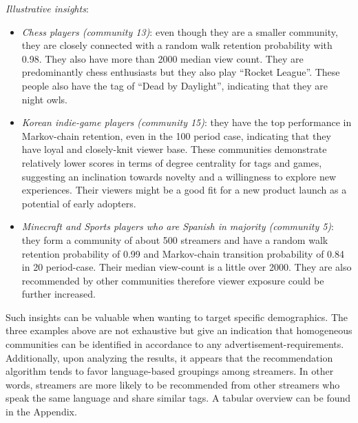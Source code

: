 \documentclass[11pt, oneside]{article}   	%
\begin{document}
\textit{Illustrative insights}:
\begin{itemize}
\item \textit{Chess players (community 13)}: even though they are a smaller community, they are closely connected with a random walk retention probability with 0.98. They also have more than 2000 median view count. They are predominantly chess enthusiasts but they also play “Rocket League”. These people also have the tag of “Dead by Daylight”, indicating that they are night owls.
\item \textit{Korean indie-game players (community 15)}: they have the top performance in Markov-chain retention, even in the 100 period case, indicating that they have loyal and closely-knit viewer base. These communities demonstrate relatively lower scores in terms of degree centrality for tags and games, suggesting an inclination towards novelty and a willingness to explore new experiences. Their viewers might be a good fit for a new product launch as a potential of early adopters.
\item \textit{Minecraft and Sports players who are Spanish in majority (community 5)}: they form a community of about 500 streamers and have a random walk retention probability of 0.99 and Markov-chain transition probability of 0.84 in 20 period-case. Their median view-count is a little over 2000. They are also recommended by other communities therefore viewer exposure could be further increased.
\end{itemize}

Such insights can be valuable when wanting to target specific demographics. The three examples above are not exhaustive but give an indication that homogeneous communities can be identified in accordance to any advertisement-requirements. Additionally, upon analyzing the results, it appears that the recommendation algorithm tends to favor language-based groupings among streamers. In other words, streamers are more likely to be recommended from other streamers who speak the same language and share similar tags. A tabular overview can be found in the Appendix. 
\newpage
\end{document}
